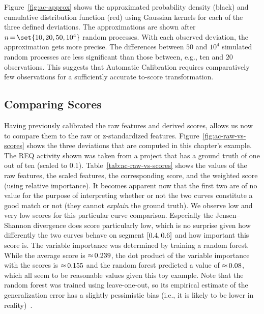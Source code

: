 Figure~\ref{fig:ac-approx} shows the approximated probability density (black) and cumulative distribution function (red) using Gaussian kernels for each of the three defined deviations.
The approximations are shown after $n\tight{=}\set{10,20,50,10^4}$ random processes.
With each observed deviation, the approximation gets more precise.
The differences between $50$ and $10^4$ simulated random processes are less significant than those between, e.g., ten and $20$ observations.
This suggests that Automatic Calibration requires comparatively few observations for a sufficiently accurate to-score transformation.



\subsection{Comparing Scores}
%
Having previously calibrated the raw features and derived scores, allows us now to compare them to the raw or z-standardized features.
Figure~\ref{fig:ac-raw-vs-scores} shows the three deviations that are computed in this chapter's example.
The \textsf{REQ} activity shown was taken from a project that has a ground truth of one out of ten (scaled to $0.1$).
Table~\ref{tab:ac-raw-vs-scores} shows the values of the raw features, the scaled features, the corresponding score, and the weighted score (using relative importance).
It becomes apparent now that the first two are of no value for the purpose of interpreting whether or not the two curves constitute a good match or not (they cannot \emph{explain} the ground truth).
We observe low and very low scores for this particular curve comparison.
Especially the Jensen--Shannon divergence does score particularly low, which is no surprise given how differently the two curves behave on segment $\interval{0.4}{0.6}$ and how important this score is.
The variable importance was determined by training a random forest.
While the average score is ${\approx}\,0.239$, the dot product of the variable importance with the scores is ${\approx}\,0.155$ and the random forest predicted a value of ${\approx}\,0.08$, which all seem to be reasonable values given this toy example.
Note that the random forest was trained using leave-one-out, so its empirical estimate of the generalization error has a slightly pessimistic bias (i.e., it is likely to be lower in reality)~\cite{cawley2010overfitting}.



